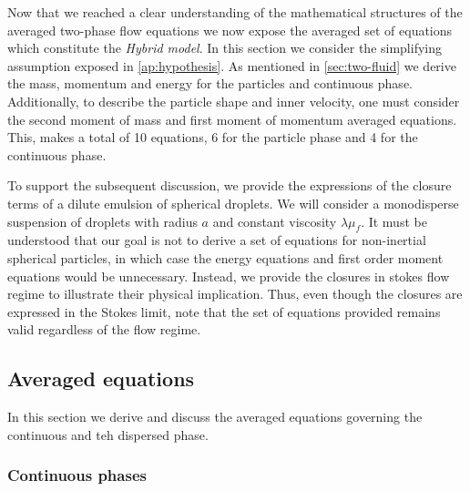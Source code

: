 


Now that we reached a clear understanding of the mathematical structures of the averaged two-phase flow equations we now expose the averaged set of equations which constitute the \textit{Hybrid model}. 
In this section we consider the simplifying assumption exposed in \ref{ap:hypothesis}. 
As mentioned in \ref{sec:two-fluid} we derive the mass, momentum and energy for the particles and continuous phase. 
Additionally, to describe the particle shape and inner velocity, one must consider the second moment of mass and first moment of momentum averaged equations. 
This, makes a total of 10 equations, 6 for the particle phase and 4 for the continuous phase.

To support the subsequent discussion, we provide the expressions of the closure terms of a dilute emulsion of spherical droplets. 
We will consider a monodisperse suspension of droplets with radius $a$ and constant viscosity $\lambda \mu_f$. 
It must be understood that our goal is not to derive a set of equations for non-inertial spherical particles, in which case the energy equations and first order moment equations would be unnecessary. 
Instead, we provide the closures in stokes flow regime to illustrate their physical implication. 
Thus, even though the closures are expressed in the Stokes limit, note that the set of equations provided remains valid regardless of the flow regime.


\subsection{Averaged equations}

In this section we derive and discuss the averaged equations governing the continuous and teh dispersed  phase. 

\subsubsection{Continuous phases}


